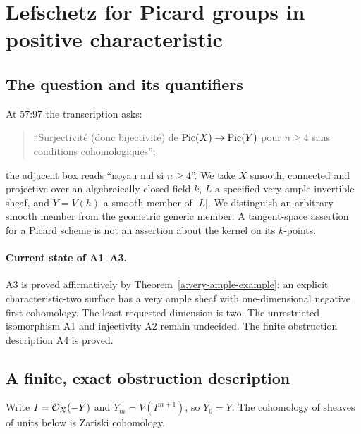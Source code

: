 \section{Lefschetz for Picard groups in positive characteristic}\label{sec:A}

\subsection{The question and its quantifiers}
At 57:97 the transcription asks:
\begin{quote}
``Surjectivité (donc bijectivité) de $\operatorname{Pic}(X)\to\operatorname{Pic}(Y)$ pour $n\geq4$
sans conditions cohomologiques'';
\end{quote}
the adjacent box reads ``noyau nul si $n\geq4$''.
We take $X$ smooth, connected and projective over an algebraically closed
field $k$, $L$ a specified very ample invertible sheaf, and $Y=V(h)$ a
smooth member of $|L|$.  We distinguish an arbitrary smooth member from
the geometric generic member.  A tangent-space assertion for a Picard
scheme is not an assertion about the kernel on its $k$-points.

\paragraph{Current state of A1--A3.}
A3 is proved affirmatively by Theorem~\ref{a:very-ample-example}: an
explicit characteristic-two surface has a very ample sheaf with
one-dimensional negative first cohomology. The least requested dimension
is two. The unrestricted isomorphism A1 and injectivity A2 remain
undecided. The finite obstruction description A4 is proved.

\subsection{A finite, exact obstruction description}
Write $I=\mathcal O_X(-Y)$ and $Y_m=V(I^{m+1})$, so $Y_0=Y$.
The cohomology of sheaves of units below is Zariski cohomology.

